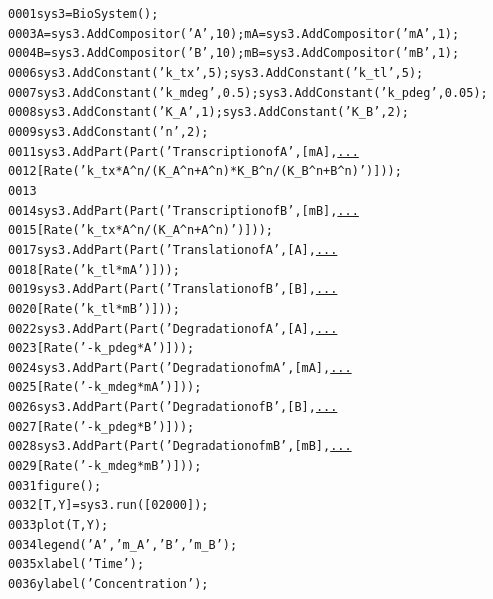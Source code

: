 \documentclass[handout]{beamer} %
\begin{document}
\begin{frame}[fragile]

\fontsize{0.65em}{0.65em}
\begin{alltt}
0001 sys3 = BioSystem(); 
0003 A = sys3.AddCompositor(\textcolor{string}{'A'}, 10); mA = sys3.AddCompositor(\textcolor{string}{'mA'}, 1);
0004 B = sys3.AddCompositor(\textcolor{string}{'B'}, 10); mB = sys3.AddCompositor(\textcolor{string}{'mB'}, 1); 
0006 sys3.AddConstant(\textcolor{string}{'k\_tx'}, 5); sys3.AddConstant(\textcolor{string}{'k\_tl'}, 5);
0007 sys3.AddConstant(\textcolor{string}{'k\_mdeg'}, 0.5); sys3.AddConstant(\textcolor{string}{'k\_pdeg'}, 0.05);
0008 sys3.AddConstant(\textcolor{string}{'K\_A'}, 1); sys3.AddConstant(\textcolor{string}{'K\_B'}, 2);
0009 sys3.AddConstant(\textcolor{string}{'n'}, 2); 
0011 sys3.AddPart(Part(\textcolor{string}{'Transcription of A'}, [mA], \textcolor{keyword}{\underline{...}}
0012     [ Rate(\textcolor{string}{'k\_tx * A\^{}n / (K\_A\^{}n + A\^{}n) * K\_B\^{}n / (K\_B\^{}n + B\^{}n)'}) ]));
0013 
0014 sys3.AddPart(Part(\textcolor{string}{'Transcription of B'}, [mB], \textcolor{keyword}{\underline{...}}
0015     [ Rate(\textcolor{string}{'k\_tx * A\^{}n / (K\_A\^{}n + A\^{}n)'}) ])); 
0017 sys3.AddPart(Part(\textcolor{string}{'Translation of A'}, [A], \textcolor{keyword}{\underline{...}}
0018     [ Rate(\textcolor{string}{'k\_tl * mA'}) ]));
0019 sys3.AddPart(Part(\textcolor{string}{'Translation of B'}, [B], \textcolor{keyword}{\underline{...}}
0020     [ Rate(\textcolor{string}{'k\_tl * mB'}) ])); 
0022 sys3.AddPart(Part(\textcolor{string}{'Degradation of A'}, [A], \textcolor{keyword}{\underline{...}}
0023     [ Rate(\textcolor{string}{'- k\_pdeg * A'}) ]));
0024 sys3.AddPart(Part(\textcolor{string}{'Degradation of mA'}, [mA], \textcolor{keyword}{\underline{...}}
0025     [ Rate(\textcolor{string}{'- k\_mdeg * mA'}) ]));
0026 sys3.AddPart(Part(\textcolor{string}{'Degradation of B'}, [B], \textcolor{keyword}{\underline{...}}
0027     [ Rate(\textcolor{string}{'- k\_pdeg * B'}) ]));
0028 sys3.AddPart(Part(\textcolor{string}{'Degradation of mB'}, [mB], \textcolor{keyword}{\underline{...}}
0029     [ Rate(\textcolor{string}{'- k\_mdeg * mB'}) ])); 
0031 figure();
0032 [T, Y] = sys3.run([0 2000]);
0033 plot(T, Y);
0034 legend(\textcolor{string}{'A'}, \textcolor{string}{'m\_A'}, \textcolor{string}{'B'}, \textcolor{string}{'m\_B'});
0035 xlabel(\textcolor{string}{'Time'});
0036 ylabel(\textcolor{string}{'Concentration'});\pause
\end{alltt}
\end{frame}
\end{document}

